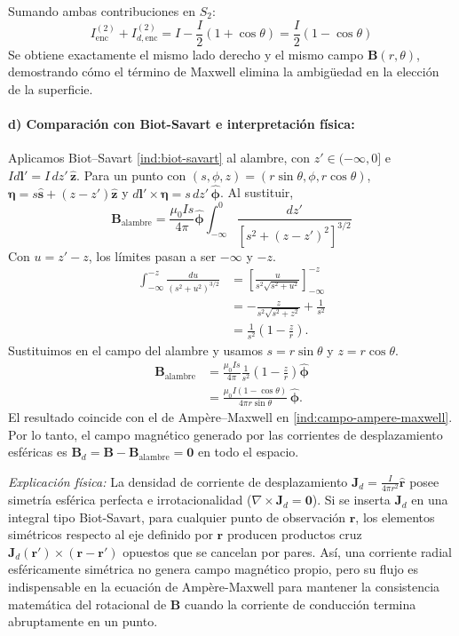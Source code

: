 \documentclass[11pt]{article}
\begin{document}
Sumando ambas contribuciones en $S_2$:
\begin{equation}
    I_{\text{enc}}^{(2)} + I_{d,\text{enc}}^{(2)} = I - \frac{I}{2}(1 + \cos\theta) = \frac{I}{2}(1 - \cos\theta)
\end{equation}
Se obtiene exactamente el mismo lado derecho y el mismo campo $\mathbf{B}(r, \theta)$, demostrando cómo el término de Maxwell elimina la ambigüedad en la elección de la superficie.

\paragraph{d) Comparación con Biot-Savart e interpretación física:}
Aplicamos Biot--Savart \eqref{ind:biot-savart} al alambre,
con $z'\in(-\infty,0]$ e $I d\mathbf l'=I\,dz'\,\hat{\mathbf z}$.
Para un punto con $(s,\phi,z)=(r\sin\theta,\phi,r\cos\theta)$,
$\boldsymbol\eta=s\hat{\mathbf s}+(z-z')\hat{\mathbf z}$ y
$d\mathbf l'\times\boldsymbol\eta=s\,dz'\,\hat{\boldsymbol\phi}$.
Al sustituir,
\begin{equation}
    \mathbf{B}_{\text{alambre}} = \frac{\mu_0 I s}{4\pi} \hat{\boldsymbol{\phi}} \int_{-\infty}^0 \frac{dz'}{\left[ s^2 + (z - z')^2 \right]^{3/2}}
\end{equation}
Con $u=z'-z$, los límites pasan a ser $-\infty$ y $-z$.
\begin{align*}
    \int_{-\infty}^{-z}\frac{du}{(s^2+u^2)^{3/2}}
    &=\left[\frac{u}{s^2\sqrt{s^2+u^2}}\right]_{-\infty}^{-z}\\
    &=-\frac{z}{s^2\sqrt{s^2+z^2}}+\frac{1}{s^2}\\
    &=\frac{1}{s^2}\left(1-\frac{z}{r}\right).
\end{align*}
Sustituimos en el campo del alambre y usamos $s=r\sin\theta$
y $z=r\cos\theta$.
\begin{align*}
    \mathbf B_{\mathrm{alambre}}
    &=\frac{\mu_0 I s}{4\pi}\frac{1}{s^2}
      \left(1-\frac{z}{r}\right)\hat{\boldsymbol\phi}\\
    &=\frac{\mu_0 I(1-\cos\theta)}{4\pi r\sin\theta}\,
      \hat{\boldsymbol\phi}.
\end{align*}
El resultado coincide con el de Ampère--Maxwell
en \eqref{ind:campo-ampere-maxwell}.
Por lo tanto, el campo magnético generado por las corrientes de desplazamiento esféricas es $\mathbf{B}_d = \mathbf{B} - \mathbf{B}_{\text{alambre}} = \mathbf{0}$ en todo el espacio.

\textit{Explicación física:} La densidad de corriente de desplazamiento $\mathbf{J}_d = \frac{I}{4\pi r^2} \hat{\mathbf{r}}$ posee simetría esférica perfecta e irrotacionalidad ($\nabla \times \mathbf{J}_d = \mathbf{0}$). Si se inserta $\mathbf{J}_d$ en una integral tipo Biot-Savart, para cualquier punto de observación $\mathbf{r}$, los elementos simétricos respecto al eje definido por $\mathbf{r}$ producen productos cruz $\mathbf{J}_d(\mathbf{r}') \times (\mathbf{r} - \mathbf{r}')$ opuestos que se cancelan por pares. Así, una corriente radial esféricamente simétrica no genera campo magnético propio, pero su flujo es indispensable en la ecuación de Ampère-Maxwell para mantener la consistencia matemática del rotacional de $\mathbf{B}$ cuando la corriente de conducción termina abruptamente en un punto.
\end{document}
